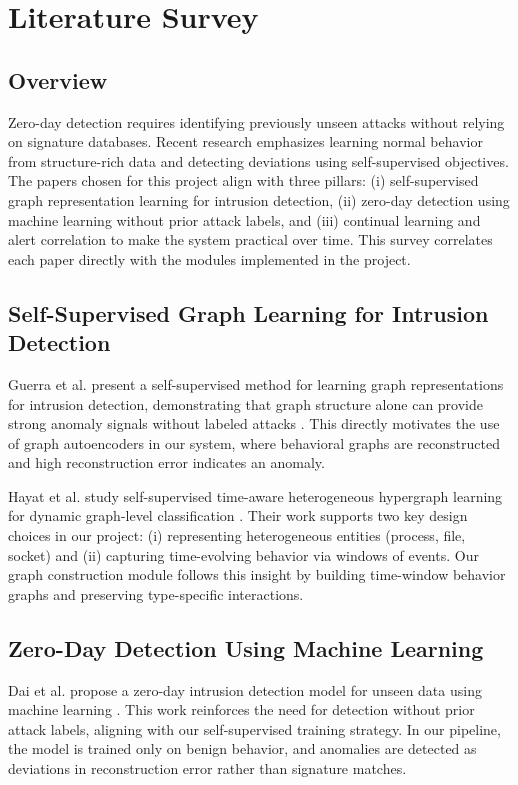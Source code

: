 \chapter{Literature Survey}
\label{ch:literature-survey}

\section{Overview}
Zero-day detection requires identifying previously unseen attacks without relying
on signature databases. Recent research emphasizes learning normal behavior from
structure-rich data and detecting deviations using self-supervised objectives. The
papers chosen for this project align with three pillars: (i) self-supervised graph
representation learning for intrusion detection, (ii) zero-day detection using
machine learning without prior attack labels, and (iii) continual learning and
alert correlation to make the system practical over time. This survey correlates
each paper directly with the modules implemented in the project.

\section{Self-Supervised Graph Learning for Intrusion Detection}
Guerra et al. present a self-supervised method for learning graph representations
for intrusion detection, demonstrating that graph structure alone can provide
strong anomaly signals without labeled attacks \cite{guerra2025graphids}. This
directly motivates the use of graph autoencoders in our system, where behavioral
graphs are reconstructed and high reconstruction error indicates an anomaly.

Hayat et al. study self-supervised time-aware heterogeneous hypergraph learning
for dynamic graph-level classification \cite{hayat2025self}. Their work supports
two key design choices in our project: (i) representing heterogeneous entities
(process, file, socket) and (ii) capturing time-evolving behavior via windows of
events. Our graph construction module follows this insight by building time-window
behavior graphs and preserving type-specific interactions.

\section{Zero-Day Detection Using Machine Learning}
Dai et al. propose a zero-day intrusion detection model for unseen data using
machine learning \cite{dai2025zero}. This work reinforces the need for detection
without prior attack labels, aligning with our self-supervised training strategy.
In our pipeline, the model is trained only on benign behavior, and anomalies are
detected as deviations in reconstruction error rather than signature matches.

